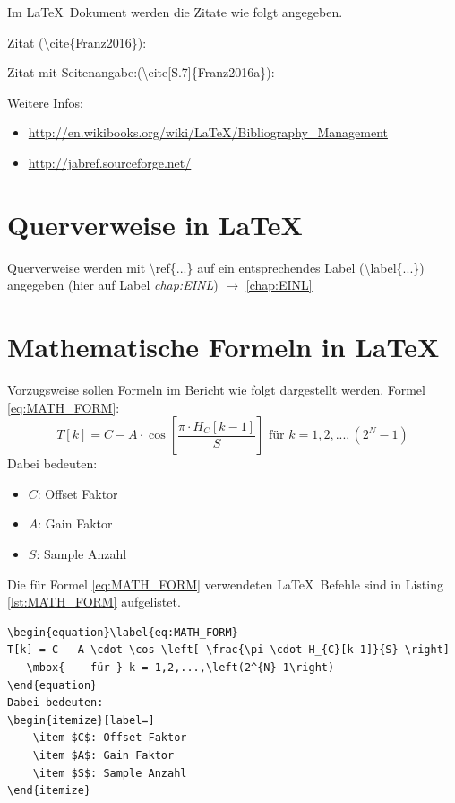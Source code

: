 \documentclass[SSS_Laborbericht.tex]{subfiles}
\begin{document}
Im \LaTeX ~Dokument werden die Zitate wie folgt angegeben.

\raggedright Zitat (\textbackslash cite\{Franz2016\}): \linebreak
\cite{Franz2016}


\raggedright Zitat mit Seitenangabe:(\textbackslash cite[S.7]\{Franz2016a\}): \linebreak
\cite[S.7]{Franz2016a}\\
\raggedright Weitere Infos:
\begin{itemize}
	\item \href{http://en.wikibooks.org/wiki/LaTeX/Bibliography\_Management}{http://en.wikibooks.org/wiki/LaTeX/Bibliography\_Management}
	\item \href{http://jabref.sourceforge.net/}{http://jabref.sourceforge.net/}
\end{itemize}

\section{Querverweise in \LaTeX}
\raggedright Querverweise werden mit \textbackslash ref\{...\} auf ein entsprechendes Label (\textbackslash label\{...\}) angegeben (hier auf Label \textit{chap:EINL}) \linebreak
$\longrightarrow$ \ref{chap:EINL}


\section{Mathematische Formeln in \LaTeX}
Vorzugsweise sollen Formeln im Bericht wie folgt dargestellt werden.\linebreak
Formel \ref{eq:MATH_FORM}:
\begin{equation}\label{eq:MATH_FORM}
T[k]=C-A\cdot\cos\left[\frac{\pi \cdot H_{C}[k-1]}{S}\right]   \mbox{    für } k = 1,2,...,\left(2^{N}-1\right)
\end{equation}
Dabei bedeuten:
\begin{itemize}[label=]
    \item $C$: Offset Faktor
    \item $A$: Gain Faktor
    \item $S$: Sample Anzahl
\end{itemize}
Die für Formel \ref{eq:MATH_FORM} verwendeten \LaTeX ~Befehle sind in Listing \ref{lst:MATH_FORM} aufgelistet.
\begin{lstlisting}[style=LATEX, frame=single, caption=Latex Befehle für Formel \ref{eq:MATH_FORM}, captionpos=b, label=lst:MATH_FORM_LST, numbers=none]
\begin{equation}\label{eq:MATH_FORM}
T[k] = C - A \cdot \cos \left[ \frac{\pi \cdot H_{C}[k-1]}{S} \right]
   \mbox{    für } k = 1,2,...,\left(2^{N}-1\right)
\end{equation}
Dabei bedeuten:
\begin{itemize}[label=]
    \item $C$: Offset Faktor
    \item $A$: Gain Faktor
    \item $S$: Sample Anzahl
\end{itemize}
\end{lstlisting}
\end{document}
